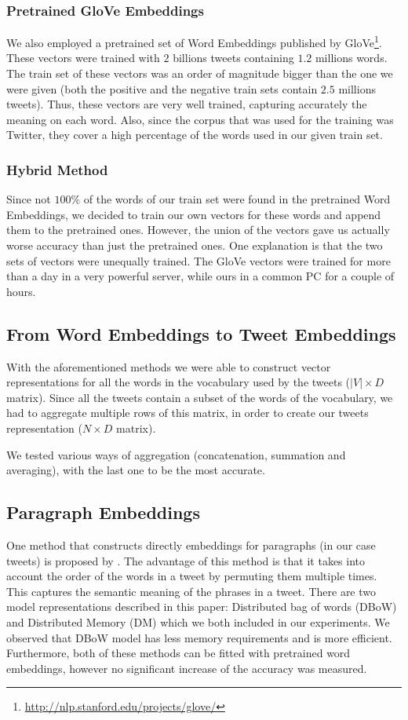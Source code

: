\subsubsection{Pretrained GloVe Embeddings}
We also employed a pretrained set of Word Embeddings published by GloVe\footnote{\url{http://nlp.stanford.edu/projects/glove/}}.
These vectors were trained with $2$ billions tweets containing $1.2$ millions words.
The train set of these vectors was an order of magnitude bigger than the one we were given
(both the positive and the negative train sets contain $2.5$ millions tweets).
Thus, these vectors are very well trained, capturing accurately the meaning on each word.
Also, since the corpus that was used for the training was Twitter, they cover a high percentage of  
the words used in our given train set.

\subsubsection{Hybrid Method}
Since not $100\%$ of the words of our train set were found in the pretrained Word Embeddings, we decided to train our own vectors for these words and append them to the pretrained ones.
However, the union of the vectors gave us actually worse accuracy than just the pretrained ones.
One explanation is that the two sets of vectors were unequally trained. 
The GloVe vectors were trained for more than a day in a very powerful server, while ours in a common PC for a couple of hours.



\subsection{From Word Embeddings to Tweet Embeddings}
With the aforementioned methods we were able to construct vector representations for all the words in the vocabulary used by the tweets ($|V| \times D$ matrix).
Since all the tweets contain a subset of the words of the vocabulary, we had to aggregate multiple rows of this matrix, in order to create our tweets representation ($N \times D$ matrix).

We tested various ways of aggregation (concatenation, summation and averaging), with the last one to be the most accurate.


\subsection{Paragraph Embeddings}
One method that constructs directly embeddings for paragraphs (in our case tweets) is proposed by \cite{le2014distributed}.
The advantage of this method is that it takes into account the order of the words in a tweet by permuting them multiple times.
This captures the semantic meaning of the phrases in a tweet.
There are two model representations described in this paper: Distributed bag of words (DBoW) and Distributed Memory (DM) which we both included in our experiments.
We observed that DBoW model has less memory requirements and is more efficient.
Furthermore, both of these methods can be fitted with pretrained word embeddings, however no significant increase of the accuracy was measured.